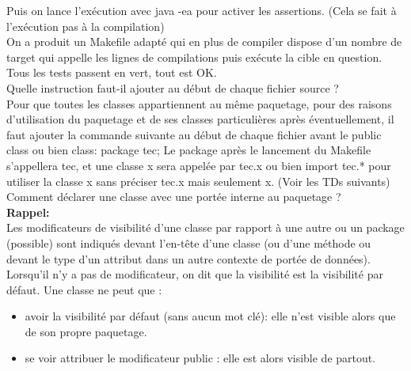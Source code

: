 \documentclass{article}
\begin{document}
Puis on lance l'exécution avec java -ea pour activer les assertions. (Cela se fait à l'exécution pas à la compilation)
\\
On a produit un Makefile adapté qui en plus de compiler dispose d’un nombre de target qui
appelle les lignes de compilations puis exécute la cible en question. Tous les tests passent en vert, tout est OK.\\
Quelle instruction faut-il ajouter au début de chaque fichier source ?\\
Pour que toutes les classes appartiennent au même paquetage, pour des raisons
d’utilisation du paquetage et de ses classes particulières après éventuellement, il faut
ajouter la commande suivante au début de chaque fichier avant le public class ou bien class:
package tec;
Le package après le lancement du Makefile s’appellera tec, et une classe x sera appelée par
tec.x ou bien import tec.* pour utiliser la classe x sans préciser tec.x mais seulement x.
(Voir les TDs suivants)
\\
\newline
Comment déclarer une classe avec une portée interne au paquetage ?
\\
\textbf{Rappel:}\\
Les modificateurs de visibilité d’une classe par rapport à une autre ou un package (possible) sont indiqués devant l'en-tête d'une classe (ou d'une méthode ou devant le type d'un attribut dans un autre contexte de portée de données). Lorsqu'il n'y a pas de modificateur, on dit que la visibilité est la visibilité par défaut.
Une classe ne peut que :
\begin{itemize}
\item avoir la visibilité par défaut (sans aucun mot clé): elle n'est visible alors que de son propre paquetage.
\item se voir attribuer le modificateur public : elle est alors visible de partout.
\end{itemize}
\end{document}
